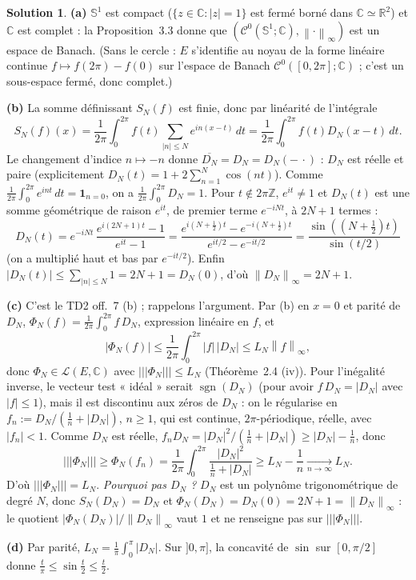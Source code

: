 \documentclass[11pt,a4paper]{article}
\newcommand{\R}{\mathbb{R}}
\newcommand{\Z}{\mathbb{Z}}
\newcommand{\C}{\mathbb{C}}
\newcommand{\norm}[1]{\left\|#1\right\|}
\newcommand{\opnorm}[1]{|\!|\!|#1|\!|\!|}
\newcommand{\Lc}{\mathcal{L}}
\newcommand{\Cz}{\mathcal{C}^0}
\DeclareMathOperator{\sgn}{sgn}
\newcommand{\Sun}{\mathbb{S}^1}
\theoremstyle{definition}
\newtheorem*{solution}{Solution}
\begin{document}
\begin{solution}
\noindent\textbf{(a)} $\Sun$ est compact ($\{z\in\C:|z|=1\}$ est fermé borné dans $\C\simeq\R^2$) et $\C$ est complet : la Proposition~3.3 donne que $(\Cz(\Sun;\C),\norm\cdot_\infty)$ est un espace de Banach. (Sans le cercle : $E$ s'identifie au noyau de la forme linéaire continue $f\mapsto f(2\pi)-f(0)$ sur l'espace de Banach $\Cz([0,2\pi];\C)$ ; c'est un sous-espace fermé, donc complet.)

\medskip
\noindent\textbf{(b)} La somme définissant $S_N(f)$ est finie, donc par linéarité de l'intégrale
\[
S_N(f)(x)=\frac1{2\pi}\int_0^{2\pi}f(t)\sum_{|n|\le N}e^{in(x-t)}\,dt=\frac1{2\pi}\int_0^{2\pi}f(t)D_N(x-t)\,dt .
\]
Le changement d'indice $n\mapsto-n$ donne $\overline{D_N}=D_N=D_N(-\,\cdot)$ : $D_N$ est réelle et paire (explicitement $D_N(t)=1+2\sum_{n=1}^N\cos(nt)$). Comme $\frac1{2\pi}\int_0^{2\pi}e^{int}\,dt=\mathbf 1_{n=0}$, on a $\frac1{2\pi}\int_0^{2\pi}D_N=1$. Pour $t\notin2\pi\Z$, $e^{it}\ne1$ et $D_N(t)$ est une somme géométrique de raison $e^{it}$, de premier terme $e^{-iNt}$, à $2N+1$ termes :
\[
D_N(t)=e^{-iNt}\,\frac{e^{i(2N+1)t}-1}{e^{it}-1}
=\frac{e^{i(N+\frac12)t}-e^{-i(N+\frac12)t}}{e^{it/2}-e^{-it/2}}
=\frac{\sin((N+\frac12)t)}{\sin(t/2)}
\]
(on a multiplié haut et bas par $e^{-it/2}$). Enfin $|D_N(t)|\le\sum_{|n|\le N}1=2N+1=D_N(0)$, d'où $\norm{D_N}_\infty=2N+1$.

\medskip
\noindent\textbf{(c)} C'est le TD2 off.~7 (b) ; rappelons l'argument. Par (b) en $x=0$ et parité de $D_N$, $\Phi_N(f)=\frac1{2\pi}\int_0^{2\pi}f\,D_N$, expression linéaire en $f$, et
\[
|\Phi_N(f)|\le\frac1{2\pi}\int_0^{2\pi}|f|\,|D_N|\le L_N\norm f_\infty ,
\]
donc $\Phi_N\in\Lc(E,\C)$ avec $\opnorm{\Phi_N}\le L_N$ (Théorème~2.4 (iv)). Pour l'inégalité inverse, le vecteur test « idéal » serait $\sgn(D_N)$ (pour avoir $f\,D_N=|D_N|$ avec $|f|\le1$), mais il est discontinu aux zéros de $D_N$ : on le régularise en $f_n:=D_N/(\frac1n+|D_N|)$, $n\ge1$, qui est continue, $2\pi$-périodique, réelle, avec $|f_n|<1$. Comme $D_N$ est réelle, $f_nD_N=|D_N|^2/(\frac1n+|D_N|)\ge|D_N|-\frac1n$, donc
\[
\opnorm{\Phi_N}\ge\Phi_N(f_n)=\frac1{2\pi}\int_0^{2\pi}\frac{|D_N|^2}{\frac1n+|D_N|}\ge L_N-\frac1n\xrightarrow[n\to\infty]{}L_N .
\]
D'où $\opnorm{\Phi_N}=L_N$. \emph{Pourquoi pas $D_N$ ?} $D_N$ est un polynôme trigonométrique de degré $N$, donc $S_N(D_N)=D_N$ et $\Phi_N(D_N)=D_N(0)=2N+1=\norm{D_N}_\infty$ : le quotient $|\Phi_N(D_N)|/\norm{D_N}_\infty$ vaut $1$ et ne renseigne pas sur $\opnorm{\Phi_N}$.

\medskip
\noindent\textbf{(d)} Par parité, $L_N=\frac1\pi\int_0^\pi|D_N|$. Sur $]0,\pi]$, la concavité de $\sin$ sur $[0,\pi/2]$ donne $\frac t\pi\le\sin\frac t2\le\frac t2$.


\end{solution}
\end{document}
